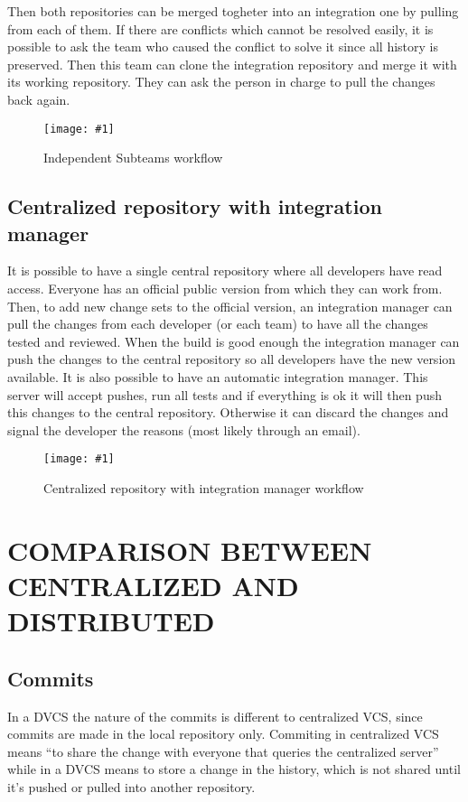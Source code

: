 \documentclass[a4paper,10pt]{article}
\newcommand{\diagrama}[2]{
    \begin{figure}[h]
        \begin{center}
            \texttt{[image: \#1]} 
        \end{center}
        \caption{#2}
    \end{figure}
}
\begin{document}
Then both repositories can be merged togheter into an integration one by pulling from each of them. If there are conflicts which cannot be resolved easily, it is possible to ask the team who caused the conflict to solve it since all history is preserved. Then this team can clone the integration repository and merge it with its working repository. They can ask the person in charge to pull the changes back again.

\diagrama{IndependentSubteams.jpg}{Independent Subteams workflow}


\subsection{Centralized repository with integration manager}
It is possible to have a single central repository where all developers have read access. Everyone has an official public version from which they can work from. Then, to add new change sets to the official version, an integration manager can pull the changes from each developer (or each team) to have all the changes tested and reviewed. When the build is good enough the integration manager can push the changes to the central repository so all developers have the new version available.
It is also possible to have an automatic integration manager. This server will accept pushes, run all tests and if everything is ok it will then push this changes to the central repository. Otherwise it can discard the changes and signal the developer the reasons (most likely through an email).

\diagrama{ResponsableIntegracion.jpg}{Centralized repository with integration manager workflow}



\section{COMPARISON BETWEEN CENTRALIZED AND DISTRIBUTED}
\label{CENTRALIZED DISTRIBUTED COMPARISON}

\subsection{Commits}
\label{Commits}
In a DVCS the nature of the commits is different to centralized VCS, since commits are made in the local repository only. 
Commiting in centralized VCS means ``to share the change with everyone that queries the centralized server'' while in a 
DVCS means to store a change in the history, which is not shared until it's pushed or pulled into another repository.
\end{document}
